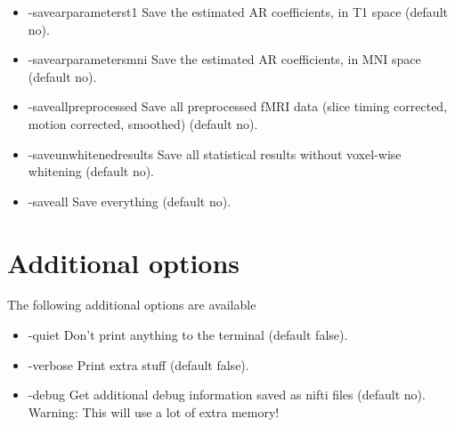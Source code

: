 \begin{itemize}
\item -savearparameterst1        
\newline \newline Save the estimated AR coefficients, in T1 space (default no). 

\item -savearparametersmni       
\newline \newline Save the estimated AR coefficients, in MNI space (default no). 

\item -saveallpreprocessed       
\newline \newline Save all preprocessed fMRI data  \newline (slice timing corrected, motion corrected, smoothed) (default no). 

\newpage

\item -saveunwhitenedresults     
\newline \newline Save all statistical results without voxel-wise whitening (default no). 

\item -saveall                   
\newline \newline Save everything (default no). 


\end{itemize}

\section{Additional options}

The following additional options are available

\begin{itemize}

\item -quiet
\newline \newline Don't print anything to the terminal (default false). 

\item -verbose
\newline \newline Print extra stuff (default false).

\item -debug
\newline \newline Get additional debug information saved as nifti files (default no). Warning: This will use a lot of extra memory! 

\end{itemize}

